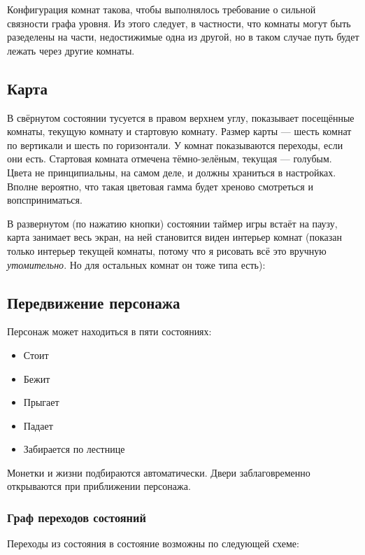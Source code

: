\documentclass[12pt,a4paper]{article}
\begin{document}
Конфигурация комнат такова, чтобы выполнялось требование о сильной связности графа уровня. Из этого следует, в частности, что комнаты могут быть разеделены на части, недостижимые одна из другой, но в таком случае путь будет лежать через другие комнаты.\\

\subsection{Карта}
В свёрнутом состоянии тусуется в правом верхнем углу, показывает посещённые комнаты, текущую комнату и стартовую комнату. Размер карты --- шесть комнат по вертикали и шесть по горизонтали. У комнат показываются переходы, если они есть. Стартовая комната отмечена тёмно-зелёным, текущая --- голубым. Цвета не принципиальны, на самом деле, и должны храниться в настройках. Вполне вероятно, что такая цветовая гамма будет хреново смотреться и вопсприниматься.\\

В развернутом (по нажатию кнопки) состоянии таймер игры встаёт на паузу, карта занимает весь экран, на ней становится виден интерьер комнат (показан только интерьер текущей комнаты, потому что я рисовать всё это вручную \textit{утомительно}. Но для остальных комнат он тоже типа есть):\\

\subsection{Передвижение персонажа}
Персонаж может находиться в пяти состояниях:
\begin{itemize}
\item Стоит
\item Бежит
\item Прыгает
\item Падает
\item Забирается по лестнице
\end{itemize}
Монетки и жизни подбираются автоматически. Двери заблаговременно открываются при приближении персонажа.\\

\subsubsection{Граф переходов состояний}
Переходы из состояния в состояние возможны по следующей схеме:\\
\end{document}
